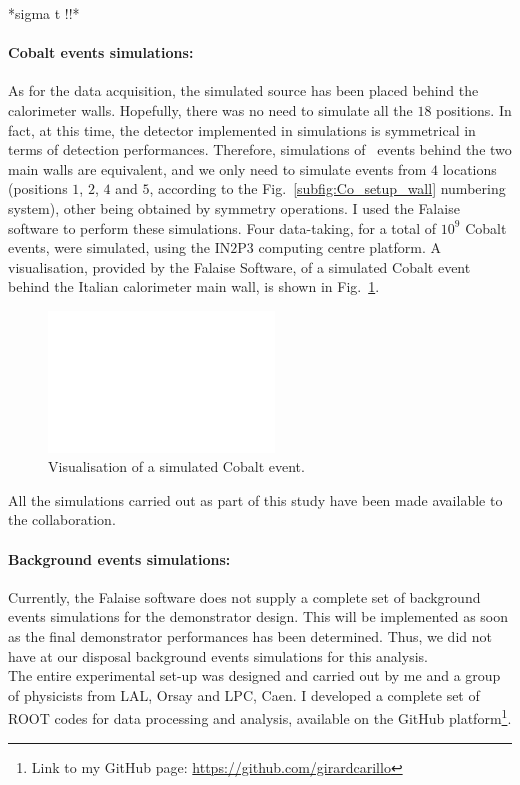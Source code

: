 *sigma t !!*

\paragraph{Cobalt events simulations:}
As for the data acquisition, the simulated source has been placed behind the calorimeter walls.
Hopefully, there was no need to simulate all the $18$ positions.
In fact, at this time, the detector implemented in simulations is symmetrical in terms of detection performances.
Therefore, simulations of \Co\ events behind the two main walls are equivalent, and we only need to simulate events from $4$ locations (positions $1$, $2$, $4$ and $5$, according to the Fig.~\ref{subfig:Co_setup_wall} numbering system), other being obtained by symmetry operations.
I used the Falaise software to perform these simulations.
Four data-taking, for a total of $10^{9}$ Cobalt events, were simulated, using the IN$2$P$3$ computing centre platform.
A visualisation, provided by the Falaise Software, of a simulated Cobalt event behind the Italian calorimeter main wall, is shown in Fig.~\ref{fig:Co_visu}.
\begin{figure}[h]
  \centering
  \includegraphics[width=6cm]{commissioning/fig_commissioning/Co_visu.pdf}
  \caption{Visualisation of a simulated Cobalt event.
    \label{fig:Co_visu}}
\end{figure}
All the simulations carried out as part of this study have been made available to the collaboration.

\paragraph{Background events simulations:}
Currently, the Falaise software does not supply a complete set of background events simulations for the demonstrator design.
This will be implemented as soon as the final demonstrator performances has been determined.
Thus, we did not have at our disposal background events simulations for this analysis.\\

The entire experimental set-up was designed and carried out by me and a group of physicists from LAL, Orsay and LPC, Caen.
I developed a complete set of ROOT codes for data processing and analysis, available on the GitHub platform\footnote{Link to my GitHub page: \href{https://github.com/girardcarillo}{https://github.com/girardcarillo}}.

